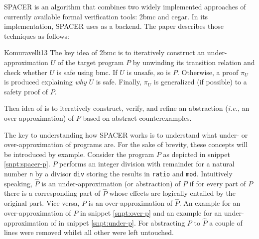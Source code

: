 SPACER \cite{Komuravelli13} is an algorithm that combines two widely implemented approaches of currently available formal verification tools: \gls{2bmc} and \gls{cegar}.
In its implementation, SPACER uses \muZ{} as a backend.
The paper describes those techniques as follows:
\begin{displaycquote}[p.1f]{Komuravelli13}
    The key idea of \gls{2bmc} is to iteratively construct an under-approximation  $ U $ of the target program $ P $ by unwinding its transition relation and check whether $ U $ is safe using \gls{bmc}.
    If $ U $ is unsafe, so is $ P $.
    Otherwise, a proof $ \pi_U $ is produced explaining \textit{why} $ U $ is safe.
    Finally, $ \pi_U $ is generalized (if possible) to a safety proof of $ P $.
    \textelp{}

    Thea idea of  is to iteratively construct, verify, and refine an abstraction (\textit{i.e.}, an over-approximation) of $ P $ based on abstract counterexamples.
\end{displaycquote}

The key to understanding how SPACER works is to understand what under- or over-approximation of programs are.
For the sake of brevity, these concepts will be introduced by example.
Consider the program $ P $ as depicted in snippet \ref{snpt:spacer-p}.
$ P $ performs an integer division with remainder for a natural number \lstinline{n} by a divisor \lstinline{div} storing the results in \lstinline{ratio} and \lstinline{mod}.
Intuitively speaking, $ \hat{P} $ is an under-approximation (or abstraction) of $ P $ if for every part of $ P $ there is a corresponding part of $ \hat{P} $ whose effects are logically entailed by the original part.
Vice versa, $ P $ is an over-approximation of $ \hat{P} $.
An example for an over-approximation of $ P $ in snippet \ref{snpt:over-p} and an example for an under-approximation of in snippet \ref{snpt:under-p}.
For abstracting $ P $ to $ \hat{P} $ a couple of lines were removed whilst all other were left untouched.

